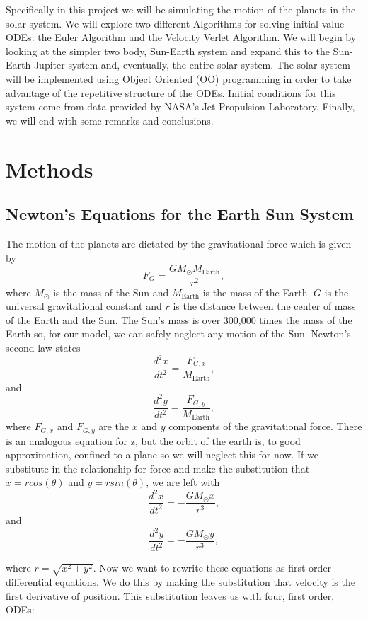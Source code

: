 \documentclass[%
oneside,                 %
final,                   %
10pt]{article}
\begin{document}
Specifically in this project we will be simulating the motion of the planets in the solar system.  We will explore two different Algorithms for solving initial value ODEs: the Euler Algorithm and the Velocity Verlet Algorithm.  We will begin by looking at the simpler two body, Sun-Earth system and expand this to the Sun-Earth-Jupiter system and, eventually, the entire solar system.  The solar system will be implemented using Object Oriented (OO) programming in order to take advantage of the repetitive structure of the ODEs.  Initial conditions for this system come from data provided by NASA's Jet Propulsion Laboratory.  Finally, we will end with some remarks and conclusions.

\section{Methods}

\subsection{Newton's Equations for the Earth Sun System}

The motion of the planets are dictated by the gravitational force which is given by
\[
F_G=\frac{GM_{\odot}M_{\mathrm{Earth}}}{r^2},
\]
where $M_{\odot}$ is the mass of the Sun and $M_{\mathrm{Earth}}$ is the mass of the Earth.  $G$ is the universal gravitational constant and $r$ is the distance between the center of mass of the Earth and the Sun.  The Sun's mass is over 300,000 times the mass of the Earth so, for our model, we can safely neglect any motion of the Sun.  Newton's second law states 
\[
\frac{d^2x}{dt^2}=\frac{F_{G,x}}{M_{\mathrm{Earth}}},
\]
and 
\[
\frac{d^2y}{dt^2}=\frac{F_{G,y}}{M_{\mathrm{Earth}}},
\]
where $F_{G,x}$ and $F_{G,y}$ are the $x$ and $y$ components of the gravitational force.  There is an analogous equation for z, but the orbit of the earth is, to good approximation, confined to a plane so we will neglect this for now.  If we substitute in the relationship for force and make the substitution that $x=r cos(\theta)$ and $y=r sin(\theta)$, we are left with
\[
\frac{d^2x}{dt^2}=-\frac{GM_{\odot}x}{r^3},
\]
and 
\[
\frac{d^2y}{dt^2}=-\frac{GM_{\odot}y}{r^3},
\]

where $ r=\sqrt{x^2+y^2} $.  Now we want to rewrite these equations as first order differential equations.  We do this by making the substitution that velocity is the first derivative of position.  This substitution leaves us with four, first order, ODEs:
\end{document}
